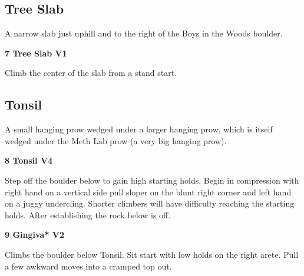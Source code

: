 \begin{multicols}{2}
			\subsection*{Tree Slab}\label{bf:Tree Slab}
			\begin{minipage}{\columnwidth}
			A narrow slab just uphill and to the right of the Boys in the Woods boulder.
			\end{minipage}
			
					\begin{minipage}{\linewidth}	
					\label{rt:Tree Slab}
\colorbox{green!20}{
\textbf{
7 Tree Slab V1    
}
}

					\begin{adjustwidth}{0.5cm}{}				
					Climb the center of the slab from a stand start.
					\end{adjustwidth}
					\end{minipage}
			\subsection*{Tonsil}\label{bf:Tonsil}
			\begin{minipage}{\columnwidth}
			A small hanging prow wedged under a larger hanging prow, which is itself wedged under the Meth Lab prow (a very big hanging prow).
			\end{minipage}
			
					\begin{minipage}{\linewidth}	
					\label{rt:Tonsil}
\colorbox{RoyalBlue!20}{
\textbf{
8 Tonsil V4    
}
}

					\begin{adjustwidth}{0.5cm}{}				
					Step off the boulder below to gain high starting holds. Begin in compression with right hand on a vertical side pull sloper on the blunt right corner and left hand on a juggy undercling.  Shorter climbers will have difficulty reaching the starting holds. After establishing the rock below is off.
					\end{adjustwidth}
					\end{minipage}
					\begin{minipage}{\linewidth}	
					\label{rt:Gingiva}
\colorbox{green!20}{
\textbf{
9 Gingiva* V2   
}
}

					\begin{adjustwidth}{0.5cm}{}				
					Climbs the boulder below Tonsil. Sit start with low holds on the right arete. Pull a few awkward moves into a cramped top out.
					\end{adjustwidth}
					\end{minipage}

\end{multicols}
